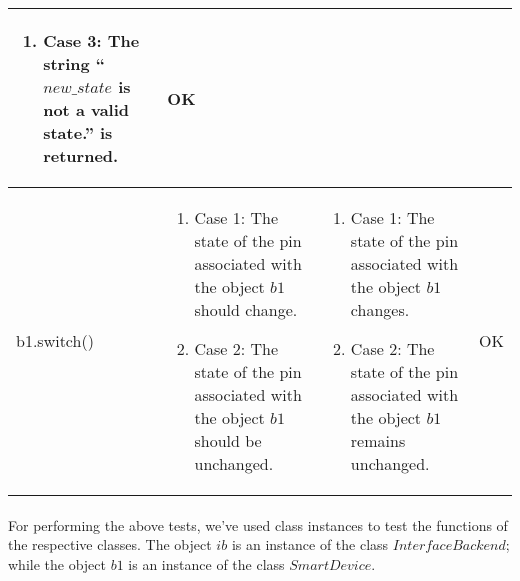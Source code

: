 \begin{tabular}{|p{2.3cm}|p{5cm}|p{5cm}|p{1.2cm}|}
\begin{enumerate}
\item[] \hspace*{-1cm}Case 3: The string ``$new\_state$ is not a valid state.'' is returned.
\end{enumerate} & \vspace*{\baselineskip}OK \\
\hline
\vspace*{\baselineskip}b1.switch() & \begin{enumerate}
\item[] \hspace*{-1cm}Case 1: The state of the pin associated with the object $b1$ should change.
\item[] \hspace*{-1cm}Case 2: The state of the pin associated with the object $b1$ should be unchanged.
\end{enumerate} & \begin{enumerate}
\item[] \hspace*{-1cm}Case 1: The state of the pin associated with the object $b1$ changes.
\item[] \hspace*{-1cm}Case 2: The state of the pin associated with the object $b1$ remains unchanged.
\end{enumerate} & \vspace*{\baselineskip}OK \\
\hline
\end{tabular}
\paragraph{}
For performing the above tests, we've used class instances to test the functions of the respective classes. The object $ib$ is an instance of the class $InterfaceBackend$; while the object $b1$ is an instance of the class $SmartDevice$.

